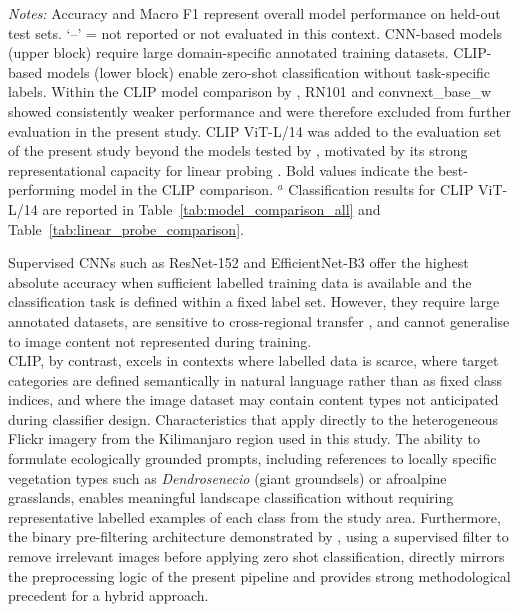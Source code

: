 \documentclass[hidelinks, 11pt]{article}
\begin{document}
\begin{table}[ht]
\begin{minipage}{\textwidth}
\textit{Notes:} Accuracy and Macro F1 represent overall model performance 
on held-out test sets. `--' = not reported or not evaluated in this context. 
CNN-based models (upper block) require large domain-specific annotated 
training datasets. CLIP-based models (lower block) enable zero-shot 
classification without task-specific labels. Within the CLIP model 
comparison by \citet{liao_mapping_2025}, RN101 and convnext\_base\_w 
showed consistently weaker performance and were therefore excluded from 
further evaluation in the present study. CLIP ViT-L/14 was added to the 
evaluation set of the present study beyond the models tested by 
\citet{liao_mapping_2025}, motivated by its strong representational 
capacity for linear probing \citep{radford_learning_2021}. Bold values 
indicate the best-performing model in the CLIP comparison. 
$^{a}$ Classification results for CLIP ViT-L/14 are reported in 
Table~\ref{tab:model_comparison_all} and 
Table~\ref{tab:linear_probe_comparison}.
\end{minipage}
\end{table}
Supervised CNNs such as ResNet-152 and EfficientNet-B3 offer the highest absolute accuracy when sufficient labelled training data is available and the classification task is defined within a fixed label set. However, they require large annotated datasets, are sensitive to cross-regional transfer \citep[a 10--17\% accuracy drop was observed by][when applying a Portuguese-trained model to Spain]{cardoso_classifying_2022}, and cannot generalise to image content not represented during training.
\\
CLIP, by contrast, excels in contexts where labelled data is scarce, where target categories are defined semantically in natural language rather than as fixed class indices, and where the image dataset may contain content types not anticipated during classifier design. Characteristics that apply directly to the heterogeneous Flickr imagery from the Kilimanjaro region used in this study. The ability to formulate ecologically grounded prompts, including references to locally specific vegetation types such as \textit{Dendrosenecio} (giant groundsels) or afroalpine grasslands, enables meaningful landscape classification without requiring representative labelled examples of each class from the study area. Furthermore, the binary pre-filtering architecture demonstrated by \citet{liao_mapping_2025}, using a supervised filter to remove irrelevant images before applying zero shot classification, directly mirrors the preprocessing logic of the present pipeline and provides strong methodological precedent for a hybrid approach.
\end{document}

